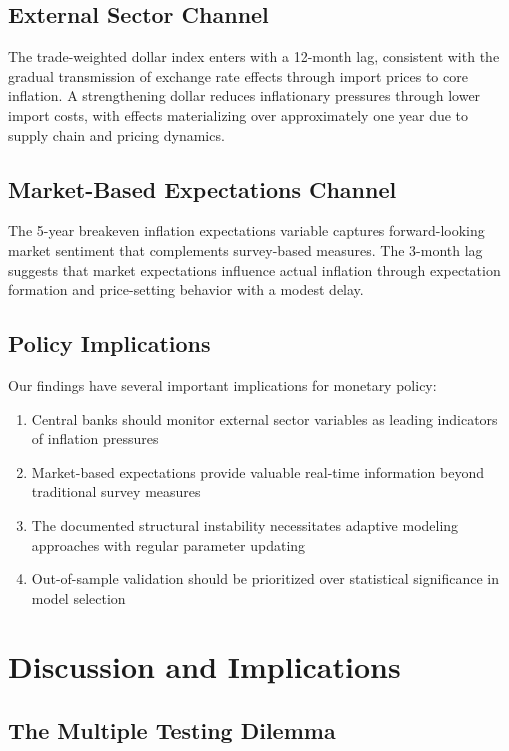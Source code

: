 \documentclass[12pt]{article}
\begin{document}
\subsection{External Sector Channel}

The trade-weighted dollar index enters with a 12-month lag, consistent with the gradual transmission of exchange rate effects through import prices to core inflation. A strengthening dollar reduces inflationary pressures through lower import costs, with effects materializing over approximately one year due to supply chain and pricing dynamics.

\subsection{Market-Based Expectations Channel}

The 5-year breakeven inflation expectations variable captures forward-looking market sentiment that complements survey-based measures. The 3-month lag suggests that market expectations influence actual inflation through expectation formation and price-setting behavior with a modest delay.

\subsection{Policy Implications}

Our findings have several important implications for monetary policy:

\begin{enumerate}
\item Central banks should monitor external sector variables as leading indicators of inflation pressures
\item Market-based expectations provide valuable real-time information beyond traditional survey measures
\item The documented structural instability necessitates adaptive modeling approaches with regular parameter updating
\item Out-of-sample validation should be prioritized over statistical significance in model selection
\end{enumerate}

\section{Discussion and Implications}

\subsection{The Multiple Testing Dilemma}
\end{document}
